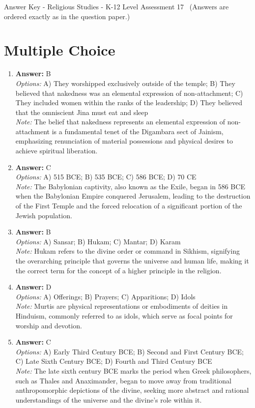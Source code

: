\documentclass[12pt]{article}
\begin{document}
\begin{center}
Answer Key - Religious Studies - K-12 Level Assessment 17 \
\small (Answers are ordered exactly as in the question paper.)
\end{center}

\section*{Multiple Choice}
\begin{enumerate}[label=\arabic*.]
\item \textbf{Answer:} B
\\ \textit{Options:} A) They worshipped exclusively outside of the temple; B) They believed that nakedness was an elemental expression of non-attachment; C) They included women within the ranks of the leadership; D) They believed that the omniscient Jina must eat and sleep
\\ \textit{Note:} The belief that nakedness represents an elemental expression of non-attachment is a fundamental tenet of the Digambara sect of Jainism, emphasizing renunciation of material possessions and physical desires to achieve spiritual liberation.
\item \textbf{Answer:} C
\\ \textit{Options:} A) 515 BCE; B) 535 BCE; C) 586 BCE; D) 70 CE
\\ \textit{Note:} The Babylonian captivity, also known as the Exile, began in 586 BCE when the Babylonian Empire conquered Jerusalem, leading to the destruction of the First Temple and the forced relocation of a significant portion of the Jewish population.
\item \textbf{Answer:} B
\\ \textit{Options:} A) Sansar; B) Hukam; C) Mantar; D) Karam
\\ \textit{Note:} Hukam refers to the divine order or command in Sikhism, signifying the overarching principle that governs the universe and human life, making it the correct term for the concept of a higher principle in the religion.
\item \textbf{Answer:} D
\\ \textit{Options:} A) Offerings; B) Prayers; C) Apparitions; D) Idols
\\ \textit{Note:} Murtis are physical representations or embodiments of deities in Hinduism, commonly referred to as idols, which serve as focal points for worship and devotion.
\item \textbf{Answer:} C
\\ \textit{Options:} A) Early Third Century BCE; B) Second and First Century BCE; C) Late Sixth Century BCE; D) Fourth and Third Century BCE
\\ \textit{Note:} The late sixth century BCE marks the period when Greek philosophers, such as Thales and Anaximander, began to move away from traditional anthropomorphic depictions of the divine, seeking more abstract and rational understandings of the universe and the divine's role within it.
\end{enumerate}
\end{document}
